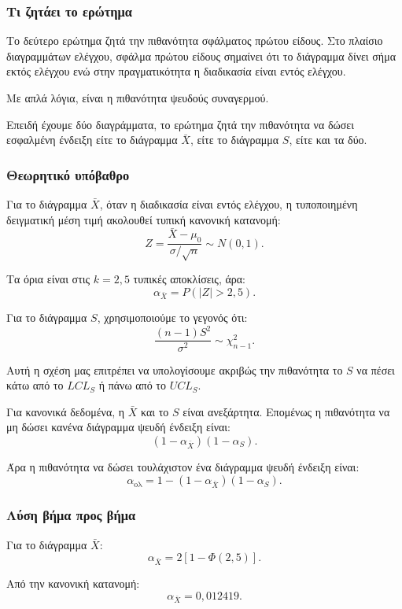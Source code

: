 \documentclass[12pt,a4paper]{article}
\begin{document}
\subsubsection*{Τι ζητάει το ερώτημα}

Το δεύτερο ερώτημα ζητά την πιθανότητα σφάλματος πρώτου είδους. Στο πλαίσιο
διαγραμμάτων ελέγχου, σφάλμα πρώτου είδους σημαίνει ότι το διάγραμμα δίνει
σήμα εκτός ελέγχου ενώ στην πραγματικότητα η διαδικασία είναι εντός ελέγχου.

Με απλά λόγια, είναι η πιθανότητα ψευδούς συναγερμού.

Επειδή έχουμε δύο διαγράμματα, το ερώτημα ζητά την πιθανότητα να δώσει
εσφαλμένη ένδειξη είτε το διάγραμμα \(\bar X\), είτε το διάγραμμα \(S\), είτε
και τα δύο.

\subsubsection*{Θεωρητικό υπόβαθρο}

Για το διάγραμμα \(\bar X\), όταν η διαδικασία είναι εντός ελέγχου, η
τυποποιημένη δειγματική μέση τιμή ακολουθεί τυπική κανονική κατανομή:
\[
    Z=\frac{\bar X-\mu_0}{\sigma/\sqrt n}\sim N(0,1).
\]

Τα όρια είναι στις \(k=2{,}5\) τυπικές αποκλίσεις, άρα:
\[
    \alpha_{\bar X}=P(|Z|>2{,}5).
\]

Για το διάγραμμα \(S\), χρησιμοποιούμε το γεγονός ότι:
\[
    \frac{(n-1)S^2}{\sigma^2}\sim \chi^2_{n-1}.
\]

Αυτή η σχέση μας επιτρέπει να υπολογίσουμε ακριβώς την πιθανότητα το \(S\) να
πέσει κάτω από το \(LCL_S\) ή πάνω από το \(UCL_S\).

Για κανονικά δεδομένα, η \(\bar X\) και το \(S\) είναι ανεξάρτητα. Επομένως η
πιθανότητα να μη δώσει κανένα διάγραμμα ψευδή ένδειξη είναι:
\[
    (1-\alpha_{\bar X})(1-\alpha_S).
\]

Άρα η πιθανότητα να δώσει τουλάχιστον ένα διάγραμμα ψευδή ένδειξη είναι:
\[
    \alpha_{\text{ολ}}=
    1-(1-\alpha_{\bar X})(1-\alpha_S).
\]

\subsubsection*{Λύση βήμα προς βήμα}

Για το διάγραμμα \(\bar X\):
\[
    \alpha_{\bar X}=2[1-\Phi(2{,}5)].
\]

Από την κανονική κατανομή:
\[
    \alpha_{\bar X}=0{,}012419.
\]
\end{document}
